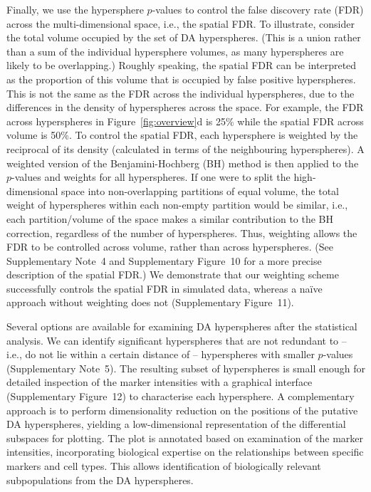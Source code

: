 \documentclass{article}
\newcommand{\suppsecfdr}{4}
\newcommand{\suppsecinterpret}{5}
\newcommand{\suppfigfdrdemo}{10}
\newcommand{\suppfigfdrres}{11}
\newcommand{\suppfiginterpret}{12}
\begin{document}
Finally, we use the hypersphere $p$-values to control the false discovery rate (FDR) across the multi-dimensional space, i.e., the spatial FDR.
To illustrate, consider the total volume occupied by the set of DA hyperspheres.
    (This is a union rather than a sum of the individual hypersphere volumes, as many hyperspheres are likely to be overlapping.)
    Roughly speaking, the spatial FDR can be interpreted as the proportion of this volume that is occupied by false positive hyperspheres.
    This is not the same as the FDR across the individual hyperspheres, due to the differences in the density of hyperspheres across the space.
    For example, the FDR across hyperspheres in Figure~\ref{fig:overview}d is 25\% while the spatial FDR across volume is 50\%.
To control the spatial FDR, each hypersphere is weighted by the reciprocal of its density (calculated in terms of the neighbouring hyperspheres).
    A weighted version of the Benjamini-Hochberg (BH) method \cite{benjamini1997multiple} is then applied to the $p$-values and weights for all hyperspheres.
    If one were to split the high-dimensional space into non-overlapping partitions of equal volume, the total weight of hyperspheres within each non-empty partition would be similar, i.e., each partition/volume of the space makes a similar contribution to the BH correction, regardless of the number of hyperspheres.
    Thus, weighting allows the FDR to be controlled across volume, rather than across hyperspheres.
(See Supplementary Note~\suppsecfdr{} and Supplementary Figure~\suppfigfdrdemo{} for a more precise description of the spatial FDR.)
We demonstrate that our weighting scheme successfully controls the spatial FDR in simulated data, whereas a na\"ive approach without weighting does not (Supplementary Figure~\suppfigfdrres{}).

Several options are available for examining DA hyperspheres after the statistical analysis.
We can identify significant hyperspheres that are not redundant to -- i.e., do not lie within a certain distance of -- hyperspheres with smaller $p$-values (Supplementary Note~\suppsecinterpret{}).
The resulting subset of hyperspheres is small enough for detailed inspection of the marker intensities with a graphical interface (Supplementary Figure~\suppfiginterpret{}) to characterise each hypersphere.
A complementary approach is to perform dimensionality reduction on the positions of the putative DA hyperspheres, yielding a low-dimensional representation of the differential subspaces for plotting.
The plot is annotated based on examination of the marker intensities, incorporating biological expertise on the relationships between specific markers and cell types.
This allows identification of biologically relevant subpopulations from the DA hyperspheres.
\end{document}
